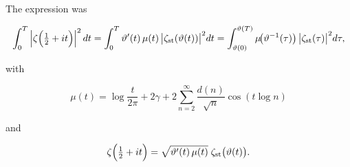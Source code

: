 The expression was

\[
\int_0^T \left|\zeta\Bigl(\tfrac12+it\Bigr)\right|^2 dt
= \int_0^T \vartheta'(t)\,\mu(t)\,\bigl|\zeta_{\rm st}(\vartheta(t))\bigr|^2 dt
= \int_{\vartheta(0)}^{\vartheta(T)} \mu\!\bigl(\vartheta^{-1}(\tau)\bigr)\,\bigl|\zeta_{\rm st}(\tau)\bigr|^2 d\tau,
\]

with

\[
\mu(t) = \log\frac{t}{2\pi} + 2\gamma + 2\sum_{n=2}^\infty \frac{d(n)}{\sqrt{n}}\cos(t\log n)
\]

and

\[
\zeta\Bigl(\tfrac12 + it\Bigr)
= \sqrt{\vartheta'(t)\,\mu(t)}\;\zeta_{\rm st}\bigl(\vartheta(t)\bigr).
\]
